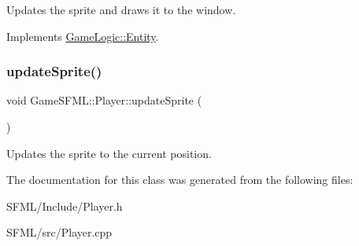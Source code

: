 Updates the sprite and draws it to the window. 

Implements \hyperlink{classGameLogic_1_1Entity_adf23a7036cb99dfc6e33434018131da4}{Game\+Logic\+::\+Entity}.

\mbox{\label{classGameSFML_1_1Player_a8ef838c82c24aa99acd5dd1db17433c2}} 
\subsubsection{\texorpdfstring{update\+Sprite()}{updateSprite()}}
{\footnotesize\ttfamily void Game\+S\+F\+M\+L\+::\+Player\+::update\+Sprite (\begin{DoxyParamCaption}{ }\end{DoxyParamCaption})}

Updates the sprite to the current position. 

The documentation for this class was generated from the following files\+:\begin{DoxyCompactItemize}
\item 
S\+F\+M\+L/\+Include/Player.\+h\item 
S\+F\+M\+L/src/Player.\+cpp\end{DoxyCompactItemize}
